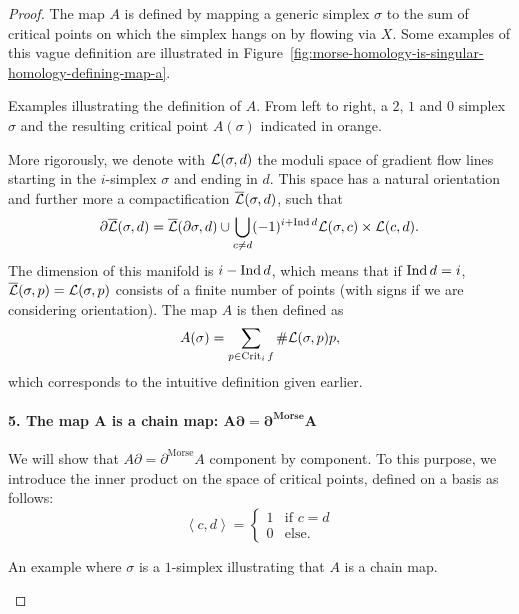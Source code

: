 \begin{proof}
    The map $A$ is defined by mapping a generic simplex $\sigma$ to the sum of critical points on which the simplex hangs on by flowing via $X$.
    Some examples of this vague definition are illustrated in Figure~\ref{fig:morse-homology-is-singular-homology-defining-map-a}.
    \begin{marginfigure}
        \centering
        \caption{
            Examples illustrating the definition of $A$.
            From left to right, a $2$, $1$ and  $0$ simplex $\sigma$ and the resulting critical point $A(\sigma)$ indicated in orange.
        }
        \label{fig:morse-homology-is-singular-homology-defining-map-a}
    \end{marginfigure}
    More rigorously, we denote with $\mathcal L(\sigma, d)$ the moduli space of gradient flow lines starting in the $i$-simplex $\sigma$ and ending in $d$.
    This space has a natural orientation and further more a compactification $\overline{\mathcal L}(\sigma, d)$, such that
    \[
    \partial \overline{\mathcal L}(\sigma, d) = \overline{\mathcal L}(\partial \sigma, d) \cup \bigcup_{c \neq d}  (-1)^{i + \operatorname{Ind} d} \mathcal L(\sigma, c) \times \mathcal L(c, d)
    .\] 
    The dimension of this manifold is $i - \operatorname{Ind} d$, which means that if  $\operatorname{Ind} d = i$,  $\overline{\mathcal L}(\sigma, p) = \mathcal L(\sigma, p)$ consists of a finite number of points (with signs if we are considering orientation).
    The map $A$ is then defined as
    \[
        A(\sigma) = \sum_{p \in \operatorname{Crit}_i f} \# \mathcal L(\sigma, p) p
    ,\] 
    which corresponds to the intuitive definition given earlier.


    \paragraph{5. The map  $\bm A$ is a chain map:  $\bm{A \partial = \partial^{\text{Morse}} A}$ }
    We will show that $A \partial = \partial^{\text{Morse}} A$ component by component. To this purpose, we introduce the inner product on the space of critical points, defined on a basis as follows:
    \[
        \left<c, d \right> = \begin{cases}
            1 & \text{if $c = d$}\\
            0 & \text{else.}
        \end{cases}
    \] 
\begin{marginfigure}
    \centering
    \caption{An example where $\sigma$ is a $1$-simplex illustrating that  $A$ is a chain map.}
    \label{fig:a-is-a-chain-map}
\end{marginfigure}


\end{proof}
